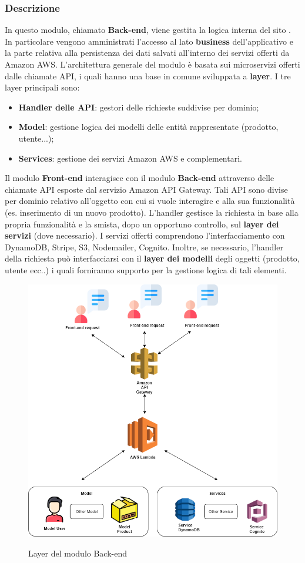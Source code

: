\subsubsection{Descrizione}
In questo modulo, chiamato \textbf{Back-end}, viene gestita la logica interna del sito \nameproject. In particolare vengono amministrati l'accesso al lato \textbf{business} dell'applicativo e la parte relativa alla persistenza dei dati salvati all'interno dei servizi offerti da Amazon AWS. L'architettura generale del modulo è basata sui microservizi offerti dalle chiamate API, i quali hanno una base in comune sviluppata a \textbf{layer}. I tre layer principali sono:
\begin{itemize}
	\item \textbf{Handler delle API}: gestori delle richieste suddivise per dominio;
	\item \textbf{Model}: gestione logica dei modelli delle entità rappresentate (prodotto, utente...);
	\item \textbf{Services}: gestione dei servizi Amazon AWS e complementari.
\end{itemize} Il modulo \textbf{Front-end} interagisce con il modulo \textbf{Back-end} attraverso delle chiamate API esposte dal servizio Amazon API Gateway. Tali API sono divise per dominio relativo all'oggetto con cui si vuole interagire e alla sua funzionalità (es. inserimento di un nuovo prodotto). L'handler gestisce la richiesta in base alla propria funzionalità e la smista, dopo un opportuno controllo, sul \textbf{layer dei servizi} (dove necessario). I servizi offerti comprendono l'interfacciamento con DynamoDB, Stripe, S3, Nodemailer, Cognito. Inoltre, se necessario, l'handler della richiesta può interfacciarsi con il \textbf{layer dei modelli} degli oggetti (prodotto, utente ecc..) i quali forniranno supporto per la gestione logica di tali elementi.

\vspace{1cm}

\begin{figure}[H]
\centering
\includegraphics[scale=0.40]{res/Architettura/Backend/img/layerBack-end.png}\\
\caption{Layer del modulo Back-end}
\end{figure}